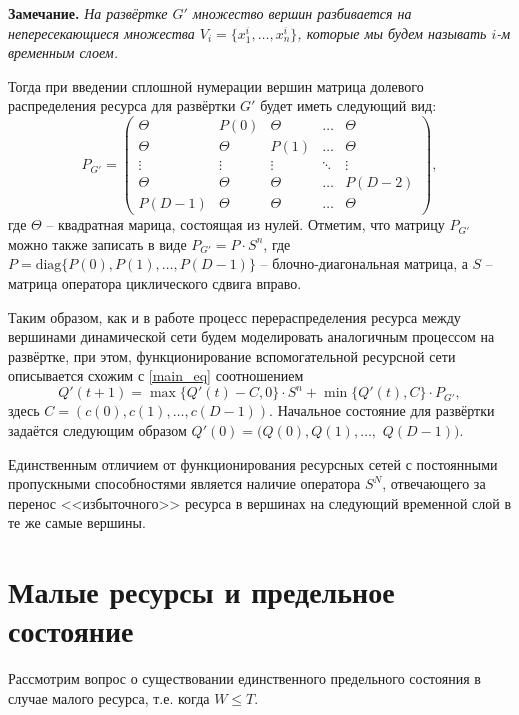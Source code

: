 \documentclass[a4paper,12pt]{article}
\begin{document}
{\bf Замечание. }
{\it На развёртке $G'$ множество вершин разбивается на непересекающиеся множества $V_i = \{x^i_1,\dots,x^i_n\}$, которые мы будем называть $i$-м временным слоем.} 

Тогда при введении сплошной нумерации вершин матрица долевого распределения ресурса для развёртки $G'$ будет иметь следующий вид:
$$P_{G'}=\left(
\begin{array}{ccccc}
\Theta& P(0)& \Theta& \dots& \Theta \\
\Theta& \Theta& P(1)& \dots& \Theta \\
\vdots& \vdots& \vdots& \ddots& \vdots \\
\Theta& \Theta& \Theta& \dots& P(D-2)\\
P(D-1)& \Theta& \Theta& \dots& \Theta
\end{array}
\right),
$$ где $\Theta$ -- квадратная марица, состоящая из нулей. Отметим, что матрицу $P_{G'}$ можно также записать в виде $P_{G'}={P}\cdot {S}^n$, где ${P} = \mathrm{diag}\{{P}(0), {P}(1), \dots, {P}(D-1)\}$ -- блочно-диагональная матрица, а ${S}$ -- матрица оператора циклического сдвига вправо.

Таким образом, как и в работе \cite{SvSkor:SkorAbdur} процесс перераспределения ресурса между вершинами динамической сети будем моделировать аналогичным процессом на развёртке, при этом, функционирование вспомогательной ресурсной сети описывается схожим с \eqref{main_eq} соотношением
\begin{equation}
	\label{unroll_eq}
	{Q'}(t + 1) = \max\{{Q'}(t) - {C}, {0}\} \cdot {S}^n + \min\{{Q'}(t), {C}\} \cdot {P_{G'}}, 
	\end{equation}
здесь ${C}=({c}(0), {c}(1),\dots, {c}(D-1))$. Начальное состояние для развёртки задаётся следующим образом ${Q}'(0) = ({Q}(0), {Q}(1),\dots,$ ${Q}(D-1))$. 
	
	Единственным отличием от функционирования ресурсных сетей с постоянными пропускными способностями является наличие оператора $S^N$, отвечающего за перенос <<избыточного>> ресурса в вершинах на следующий временной слой в те же самые вершины.

	
\section{Малые ресурсы и предельное состояние}

\indent
	
Рассмотрим вопрос о существовании единственного предельного состояния в случае малого ресурса, т.е. когда $W\leq T$.
\end{document}

